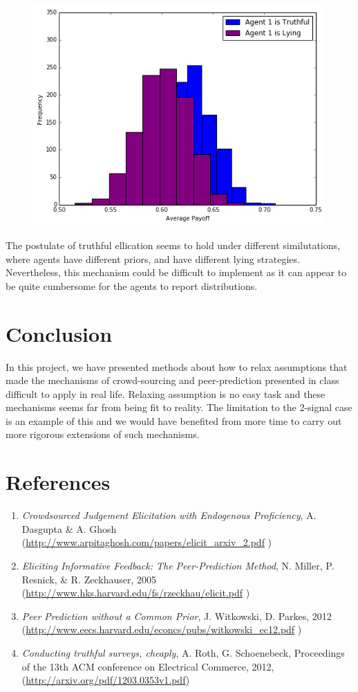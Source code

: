 \documentclass{scrartcl}
\begin{document}
\begin{figure}[H]
\centering
\includegraphics[scale=0.5]{images/3_3}
\end{figure}

The postulate of truthful ellication seems to hold under different similutations, where agents have different priors, and have different lying strategies. Nevertheless, this mechanism could be difficult to implement as it can appear to be quite cumbersome for the agents to report distributions.\\

\section{Conclusion}
In this project, we have presented methods about how to relax assumptions that made the mechanisms of crowd-sourcing and peer-prediction presented in class difficult to apply in real life. Relaxing assumption is no easy task and these mechanisms seems far from being fit to reality. The limitation to the 2-signal case is an example of this and we would have benefited from more time to carry out more rigorous extensions of such mechanisms.

\section*{References}
\begin{enumerate}
	\item \emph{Crowdsourced Judgement Elicitation with Endogenous Proficiency}, A. Dasgupta \& A. Ghosh (\url{http://www.arpitaghosh.com/papers/elicit_arxiv_2.pdf} \label{itm:1})
	\item \emph{Eliciting Informative Feedback: The Peer-Prediction Method}, N. Miller, P. Resnick, \& R. Zeckhauser, 2005 (\url{http://www.hks.harvard.edu/fs/rzeckhau/elicit.pdf} \label{itm:2})
	\item \emph{Peer Prediction without a Common Prior}, J. Witkowski, D. Parkes, 2012 $\quad$
	(\url{http://www.eecs.harvard.edu/econcs/pubs/witkowski_ec12.pdf} \label{itm:3})
	\item \emph{Conducting truthful surveys, cheaply}, A. Roth, G. Schoenebeck, Proceedings of the 13th ACM conference on Electrical Commerce, 2012, \quad (\url{http://arxiv.org/pdf/1203.0353v1.pdf})
\end{enumerate}
\end{document}
